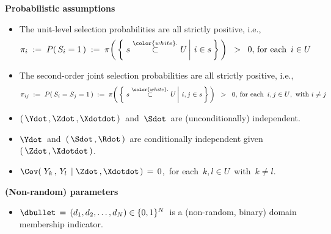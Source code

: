 \vskip 0.2cm
\noindent
\textbf{Probabilistic assumptions}
\begin{itemize}
\item
    The unit-level selection probabilities are all strictly positive, i.e.,
    \begin{equation*}
    \pi_{i}
    \; := \;
        P(\,S_{i} = 1\,)
    \; := \;
        \pi\!\left(\,\left\{\,
            \left.
            s \overset{{\color{white}.}}{\subset} U
            \,\right\vert\,
            i \in s
            \,\right\}
        \,\right)
    \;\; > \;\;
        0,\,
    \textnormal{for each \,$i \in U$\,
    }
    \end{equation*}
\item
    The second-order joint selection probabilities are all strictly positive, i.e.,
    \begin{equation*}
    \pi_{ij}
    \; := \;
        P(\,S_{i} = S_{j} = 1\,)
    \; := \;
        \pi\!\left(\,\left\{\,
            \left.
            s \overset{{\color{white}.}}{\subset} U
            \,\right\vert\,
            i, j \in s
            \,\right\}
        \,\right)
    \;\; > \;\;
        0,\,
    \textnormal{for each \,$i,j \in U$,\, with $i \neq j$}
    \end{equation*}
\item
    $\left(\,\Ydot\,,\Zdot\,,\Xdotdot\,\right)$\, and \,$\Sdot$\, are (unconditionally) independent.
\item
    $\Ydot$\,
    and
    \,$(\,\Sdot\,,\Rdot\,)$\,
    are {\color{red}conditionally independent} given \,$\left(\,\Zdot\,,\Xdotdot\,\right)$.
\item
    $\Cov\!\left(\;Y_{k}\,,\,Y_{l}\;\left\vert\;\Zdot\,,\Xdotdot\right.\right) \,=\, 0$,\,
    for each \,$k, l \in U$\, with \,$k \neq l$.
\end{itemize}

\vskip 0.2cm
\noindent
\textbf{(Non-random) parameters}
\begin{itemize}
\item
    $\dbullet \,=\, (d_{1},d_{2},\ldots,d_{N}) \in \{0,1\}^{N}$\,
    is a (non-random, binary) domain membership indicator.
\end{itemize}

